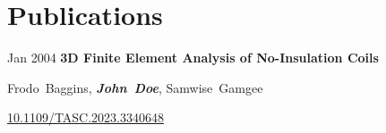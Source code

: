 \section{Publications}
    \begin{samepage}
        \begin{twocolentry}{
            Jan 2004
        }
            \textbf{3D Finite Element Analysis of No-Insulation Coils}

            \vspace{0.10 cm}

            \mbox{Frodo Baggins}, \mbox{\textbf{\textit{John Doe}}}, \mbox{Samwise Gamgee}
        \end{twocolentry}


        \vspace{0.10 cm}

        \begin{onecolentry}
    \href{https://doi.org/10.1109/TASC.2023.3340648}{10.1109/TASC.2023.3340648}
        \end{onecolentry}
    \end{samepage}
